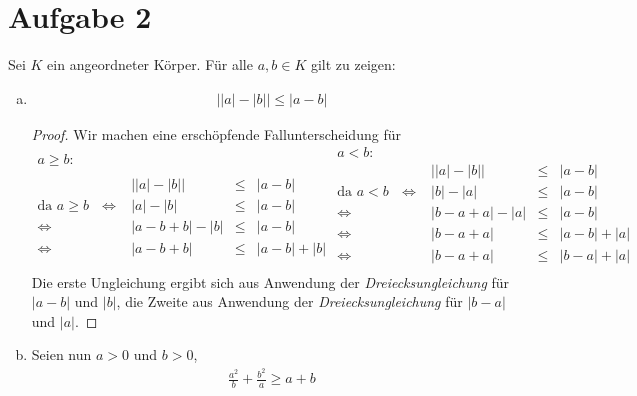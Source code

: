 \documentclass{scrreprt}
\begin{document}
	\section*{Aufgabe 2}
	Sei $K$ ein angeordneter Körper. Für alle $a,b \in K$ gilt zu zeigen:
		\begin{enumerate}[(a)]
			\item
				\begin{align*}
					\bigl| \left|a\right| - \left|b\right| \bigr| \leq |a -b|
				\end{align*}
				\begin{proof}
				Wir machen eine erschöpfende Fallunterscheidung für
					\begin{equation*}
						\begin{aligned}
							a \geq b:\\\\
							&\bigl| \left|a\right| - \left|b\right| \bigr| & \leq& |a -b|\\
							\text{da $a \geq b$ } \Leftrightarrow &| a | - | b | & \leq& | a - b | \\
							\Leftrightarrow & | a - b + b | - | b | & \leq& | a - b |\\
							\Leftrightarrow & | a - b + b | & \leq& | a - b | + | b |\\
						\end{aligned}
						\begin{aligned}
							a < b:\\
							&\bigl| \left|a\right| - \left|b\right| \bigr| & \leq& |a -b|\\
							\text{da $a < b$ } \Leftrightarrow &| b | - | a | & \leq& | a - b | \\
							\Leftrightarrow & | b - a + a | - | a | & \leq& | a - b |\\
							\Leftrightarrow & | b - a + a | & \leq& | a - b | + | a |\\
							\Leftrightarrow & | b - a + a | & \leq& | b - a | + | a |\\
						\end{aligned}
					\end{equation*}
					Die erste Ungleichung ergibt sich aus Anwendung der \emph{Dreiecksungleichung} für $|a - b|$ und $|b|$, die Zweite aus Anwendung der \emph{Dreiecksungleichung} für $|b-a|$ und $|a|$.
				\end{proof}
			\pagebreak
			\item
				Seien nun $a>0$ und $b>0$,
				\begin{align*}
					\frac{a^2}{b} + \frac{b^2}{a} \geq a + b

\end{align*}
\end{enumerate}
\end{document}
